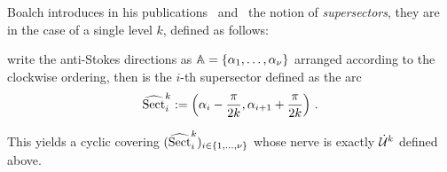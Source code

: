 \begin{rem}\label{rem:superSectors}
  Boalch introduces in his publications~\cite[19]{boalch}
  and~\cite[Def.1.23]{thboalch} the notion of \emph{supersectors}, they are in
  the case of a single level $k$, defined as follows:
  \begin{einr}
    write the anti-Stokes directions as $\mathbb{A}=\{\alpha_1,\dots,\alpha_\nu\}$
    arranged according to the clockwise ordering, then is the $i$-th
    supersector defined as the arc
    \[
      \widehat{\operatorname{Sect}}^k_i:=
        \left(\alpha_i-\frac{\pi}{2k},\alpha_{i+1}+\frac{\pi}{2k}\right) \,.
    \]
  \end{einr}
  This yields a cyclic covering $(\widehat{\operatorname{Sect}}^k_i)_{i\in\{1,\dots,\nu\}}$ whose
  nerve is exactly $\dot{\mathcal{U}}^k$ defined above.
  \begin{comment}
    \begin{center}
      \begin{tikzpicture}[scale=3]
        \node[] (zero) at (0,0) {};
        \draw[blue] (zero) circle (1cm);

        \fill[fill=green!20!white] (0,0) -- ({cos( 15 )},{sin( 15 )}) arc
          (15:85:1) -- cycle;

        \fill[fill=red!60!black] (0,0) -- ({cos( 15 )*0.5},{sin( 15 )*0.5}) arc
          (15:45:0.5) -- cycle;
        \fill[fill=red!60!black] (0,0) -- ({cos( 55 )*0.5},{sin( 55 )*0.5}) arc
          (55:85:0.5) -- cycle;

        \fill[fill=green!20!white] (0,0) -- ({cos( 15 )*0.4},{sin( 15 )*0.4}) arc
          (15:85:0.4) -- cycle;

        \node[green!40!black] at (1,1) {$\widehat\Sect_i$};

        \node[] (lft) at ({cos( 85 )},{sin( 85 )}) {};
        \node[] (rgt) at ({cos( 15 )},{sin( 15 )}) {};

        \draw[->,red!40!black] ({cos( 45 )},{sin( 45 )})
          to [out=35, in=25] (rgt);

        \draw[->,red!40!black] ({cos( 55 )},{sin( 55 )})
          to [out=65, in=75] (lft);

        \draw[thick,red!40!black,path fading=west] (0,0) -- +({cos( 85 )},{sin( 85 )});
        \draw[thick,red!40!black,path fading=west] (0,0) -- +({cos( 15 )},{sin( 15 )});
        \fill[red!40!black] ({cos( 85 )},{sin( 85 )}) circle (1pt);
        \fill[red!40!black] ({cos( 15 )},{sin( 15 )}) circle (1pt);

        \foreach \w/\str in {10/,
                             20/,
                             45/$\alpha_{i+1}$,
                             55/$\alpha_{i}$}
        {\draw (0,0) -- +({cos( \w )},{sin( \w )}) node[right] {\str};
         \fill[blue!20!white] ({cos( \w )},{sin( \w )}) circle (.7pt);
         \foreach \sep in {60,120,180,240,300}
         {\draw (0,0) -- +({cos( \w + \sep )},{sin( \w + \sep )});
          \fill[blue!20!white]
            ({cos( \w + \sep )},{sin( \w + \sep )}) circle (.7pt);
         }
        };


        \fill (zero) circle (1pt);
      \end{tikzpicture}
    \end{center}
  \end{comment}
\end{rem}
